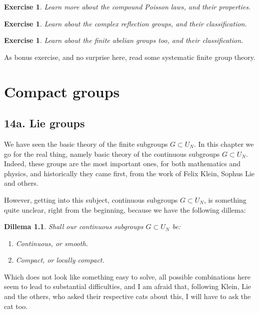 \documentclass[12pt]{amsbook}
\newtheorem{dillema}[theorem]{Dillema}
\newtheorem{exercise}[theorem]{Exercise}
\begin{document}
\begin{exercise}
Learn more about the compound Poisson laws, and their properties.
\end{exercise}

\begin{exercise}
Learn about the complex reflection groups, and their classification.
\end{exercise}

\begin{exercise}
Learn about the finite abelian groups too, and their classification.
\end{exercise}

As bonus exercise, and no surprise here, read some systematic finite group theory.

\chapter{Compact groups}

\section*{14a. Lie groups}

We have seen the basic theory of the finite subgroups $G\subset U_N$. In this chapter we go for the real thing, namely basic theory of the continuous subgroups $G\subset U_N$. Indeed, these groups are the most important ones, for both mathematics and physics, and historically they came first, from the work of Felix Klein, Sophus Lie and others.

\bigskip

However, getting into this subject, continuous subgroups $G\subset U_N$, is something quite unclear, right from the beginning, because we have the following dillema:

\begin{dillema}
Shall our continuous subgroups $G\subset U_N$ be:
\begin{enumerate}
\item Continuous, or smooth.

\item Compact, or locally compact.
\end{enumerate}
\end{dillema}

Which does not look like something easy to solve, all possible combinations here seem to lead to substantial difficulties, and I am afraid that, following Klein, Lie and the others, who asked their respective cats about this, I will have to ask the cat too.
\end{document}
